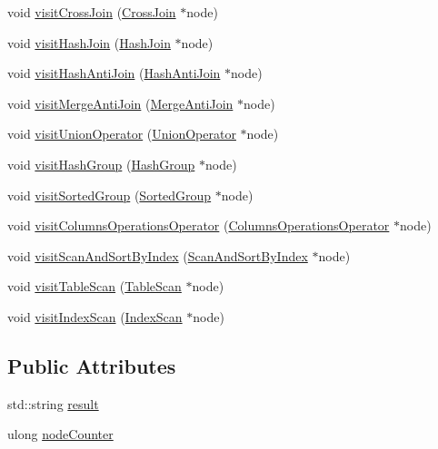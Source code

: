 \begin{DoxyCompactItemize}
\item 
void \hyperlink{class_physical_operator_drawing_visitor_aaeb9fbec796677a5483384cbddd3f827}{visit\+Cross\+Join} (\hyperlink{class_cross_join}{Cross\+Join} $\ast$node)
\item 
void \hyperlink{class_physical_operator_drawing_visitor_a22032e2685059a3221b85bc990fe684e}{visit\+Hash\+Join} (\hyperlink{class_hash_join}{Hash\+Join} $\ast$node)
\item 
void \hyperlink{class_physical_operator_drawing_visitor_a1825f8934ad3c2267a40a599b13d2a1a}{visit\+Hash\+Anti\+Join} (\hyperlink{class_hash_anti_join}{Hash\+Anti\+Join} $\ast$node)
\item 
void \hyperlink{class_physical_operator_drawing_visitor_ab47caea2d0f82662947a0bf7087e0514}{visit\+Merge\+Anti\+Join} (\hyperlink{class_merge_anti_join}{Merge\+Anti\+Join} $\ast$node)
\item 
void \hyperlink{class_physical_operator_drawing_visitor_aeaa1cd49533ed1bb74921262b918bb06}{visit\+Union\+Operator} (\hyperlink{class_union_operator}{Union\+Operator} $\ast$node)
\item 
void \hyperlink{class_physical_operator_drawing_visitor_a6841170440f377c240a7c0a7af179a29}{visit\+Hash\+Group} (\hyperlink{class_hash_group}{Hash\+Group} $\ast$node)
\item 
void \hyperlink{class_physical_operator_drawing_visitor_a1c7736861639025a85d54867d7eeafca}{visit\+Sorted\+Group} (\hyperlink{class_sorted_group}{Sorted\+Group} $\ast$node)
\item 
void \hyperlink{class_physical_operator_drawing_visitor_ad1fb3f6d50ba14ad674a71e5f6c35d12}{visit\+Columns\+Operations\+Operator} (\hyperlink{class_columns_operations_operator}{Columns\+Operations\+Operator} $\ast$node)
\item 
void \hyperlink{class_physical_operator_drawing_visitor_abf3323e213f5c7502e76b0d9afb9fe33}{visit\+Scan\+And\+Sort\+By\+Index} (\hyperlink{class_scan_and_sort_by_index}{Scan\+And\+Sort\+By\+Index} $\ast$node)
\item 
void \hyperlink{class_physical_operator_drawing_visitor_a709a44c2c02c9fc42d44fe3822c22f5b}{visit\+Table\+Scan} (\hyperlink{class_table_scan}{Table\+Scan} $\ast$node)
\item 
void \hyperlink{class_physical_operator_drawing_visitor_a3d8f7b6bff44d79fb741b2709587f867}{visit\+Index\+Scan} (\hyperlink{class_index_scan}{Index\+Scan} $\ast$node)
\end{DoxyCompactItemize}
\subsection*{Public Attributes}
\begin{DoxyCompactItemize}
\item 
std\+::string \hyperlink{class_physical_operator_drawing_visitor_a5663f7f6a5c8a6ad25d0c4c8f918123e}{result}
\item 
ulong \hyperlink{class_physical_operator_drawing_visitor_a75aa4987d070c40a3ec2e4e9c950c9e0}{node\+Counter}
\end{DoxyCompactItemize}


